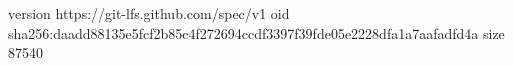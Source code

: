 version https://git-lfs.github.com/spec/v1
oid sha256:daadd88135e5fcf2b85c4f272694ccdf3397f39fde05e2228dfa1a7aafadfd4a
size 87540
